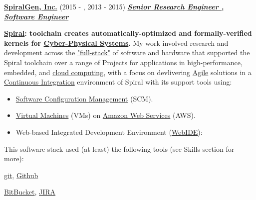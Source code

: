 \documentclass{article}
\newcommand{\employer}[3]{{ \textbf{#1} (#2) \underline{\textbf{\emph{#3}}}\\  }}
\begin{document}
\employer{\href{http://spiralgen.com/}{SpiralGen, Inc.}}{2015 - , 2013 - 2015}{Senior Research Engineer , Software Engineer}


\vspace{1mm}
\textbf{\href{http://spiral.net/}{Spiral}: toolchain creates automatically-optimized  and formally-verified kernels for \href{https://en.wikipedia.org/wiki/Cyber-physical_system}{Cyber-Physical Systems}.} My work involved research and development across the \href{https://www.google.com/search?q=full+stack+software&oq=full+stack+software&aqs=chrome..69i57.2623j0j7&sourceid=chrome&es_sm=122&ie=UTF-8}{"full-stack"} of software and hardware that supported the Spiral toolchain over a range of Projects for applications in high-performance, embedded, and \href{https://en.wikipedia.org/wiki/Cloud_computing}{cloud computing}, with a focus on devlivering \href{https://en.wikipedia.org/wiki/Agile_software_development}{Agile} solutions in a \href{http://en.wikipedia.org/wiki/Continuous_integration}{Continuous Integration} environment of Spiral with its support tools using:

    \begin{itemize}
      \item \href{https://en.wikipedia.org/wiki/Software_configuration_management}{Software Configuration Management} (SCM). 
      \item \href{https://en.wikipedia.org/wiki/Virtual_machine}{Virtual Machines} (VMs) on \href{https://en.wikipedia.org/wiki/Amazon_Web_Services}{Amazon Web Services}  (AWS).
      \item Web-based Integrated Development Environment (\href{https://www.google.com/search?q=webide&oq=webide&aqs=chrome..69i57j0l5.813j0j7&sourceid=chrome&es_sm=122&ie=UTF-8#q=browser+ide}{WebIDE}):
    \end{itemize}

This software stack used (at least) the following tools (see Skills section for more):

\href{https://git-scm.com/}{git}, \href{https://github.com/spiralgen}{Github}

\href{https://bitbucket.org/}{BitBucket}, \href{https://www.atlassian.com/software/jira}{JIRA}
\end{document}
